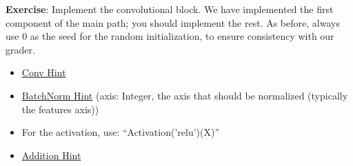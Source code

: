 {\textbf{Exercise}}: Implement the convolutional block. We have implemented the first component of the main path; you should implement the rest. As before, always use 0 as the seed for the random initialization, to ensure consistency with our grader.
\begin{itemize}
\item \href{https://keras.io/layers/convolutional/#conv2d}{Conv Hint}
\item \href{https://keras.io/layers/normalization/#batchnormalization}{BatchNorm Hint} (axis: Integer, the axis that should be normalized (typically the features axis))
\item For the activation, use:  ``Activation('relu')(X)''
\item \href{https://keras.io/layers/merge/#add}{Addition Hint}
\end{itemize}

